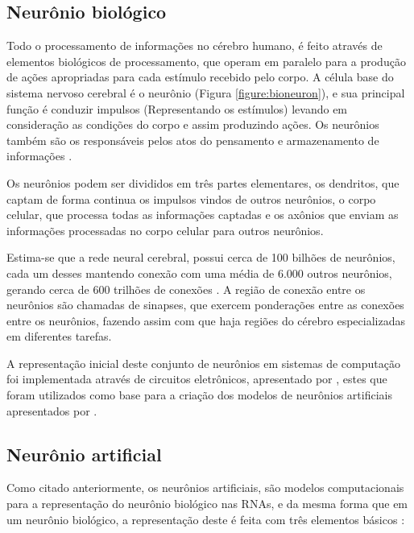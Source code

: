 \subsection{Neurônio biológico}

\par Todo o processamento de informações no cérebro humano, é feito através de elementos biológicos de processamento, que operam em paralelo para a produção de ações apropriadas para cada estímulo recebido pelo corpo. A célula base do sistema nervoso cerebral é o neurônio (Figura \ref{figure:bioneuron}), e sua principal função é conduzir impulsos (Representando os estímulos) levando em consideração as condições do corpo e assim produzindo ações. Os neurônios também são os responsáveis pelos atos do pensamento e armazenamento de informações \cite{livroNunes2016}.

\par Os neurônios podem ser divididos em três partes elementares, os dendritos, que captam de forma continua os impulsos vindos de outros neurônios, o corpo celular, que processa todas as informações captadas e os axônios que enviam as informações processadas no corpo celular para outros neurônios.


\par Estima-se que a rede neural cerebral, possui cerca de 100 bilhões de neurônios, cada um desses mantendo conexão com uma média de 6.000 outros neurônios, gerando cerca de 600 trilhões de conexões \cite{shepherdgordonm1990}. A região de conexão entre os neurônios são chamadas de sinapses, que exercem ponderações entre as conexões entre os neurônios, fazendo assim com que haja regiões do cérebro especializadas em diferentes tarefas.

\par A representação inicial deste conjunto de neurônios em sistemas de computação foi implementada através de circuitos eletrônicos, apresentado por , estes que foram utilizados como base para a criação dos modelos de neurônios artificiais apresentados por .

\subsection{Neurônio artificial}

\par Como citado anteriormente, os neurônios artificiais, são modelos computacionais para a representação do neurônio biológico nas RNAs, e da mesma forma que em um neurônio biológico, a representação deste é feita com três elementos básicos \cite{Haykin2001}:  

